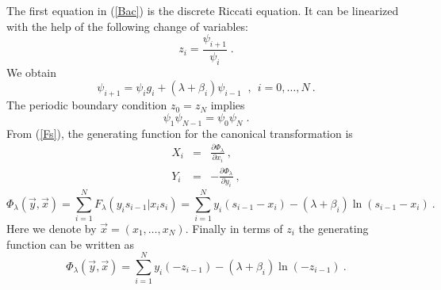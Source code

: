 \documentclass[a4paper,11pt]{article}
\begin{document}
The first equation in (\ref{Bac}) is the discrete Riccati equation. It can
be linearized with the help of the following change of variables:
\begin{equation}
\label{linear}
z_i=\frac{\psi _{i+1}}{\psi_i}\;.
\end{equation}
We obtain
\begin{equation}
\label{Ric}
\psi_{i+1}=\psi_ig_i+(\lambda+\beta_i)\psi_{i-1}\;\;,~~ i=0, \ldots ,N ~.
\end{equation}
The periodic boundary condition $z_0=z_{N}$ implies
\begin{equation}
\label{cond_psi}
\psi _1\psi_{N-1}=\psi_0\psi_N\;.
\end{equation}
{}From (\ref{Fs}), the generating function for the canonical transformation
is
\begin{eqnarray}
\label{gen_can2}
X_i&=&\frac{\partial \Phi_\lambda}{\partial x_i} ~,\\
Y_i&=&-\frac{\partial \Phi_\lambda}{\partial y_i} ~,
\end{eqnarray}
\begin{equation}
\label{gen_can1}
\Phi_\lambda({\vec y},{\vec x})=\sum_{i=1}^N F_\lambda(y_is_{i-1}|x_is_i)
       =\sum_{i=1}^Ny_i(s_{i-1}-x_i)-(\lambda +\beta_i)\ln (s_{i-1}-x_i)~.
\end{equation}
Here we denote by ${\vec x}=(x_1, \ldots , x_N)$. Finally in terms of $z_i$
the generating function can be written as
\begin{equation}
\label{gen_z}
\Phi_\lambda({\vec y},{\vec x})
         =\sum_{i=1}^Ny_i(-z_{i-1})-(\lambda +\beta_i)\ln (-z_{i-1})~.
\end{equation}
\end{document}

